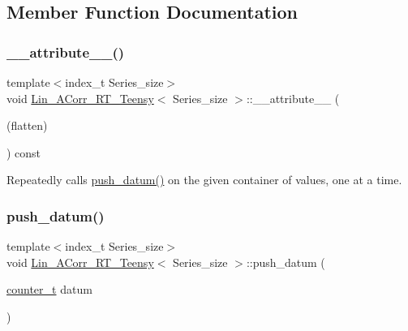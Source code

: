 \subsection{Member Function Documentation}
\mbox{\label{classLin__ACorr__RT__Teensy_a0bfee7278e28c759cca2497749aeecf7}} 
\subsubsection{\texorpdfstring{\+\_\+\+\_\+attribute\+\_\+\+\_\+()}{\_\_attribute\_\_()}}
{\footnotesize\ttfamily template$<$index\+\_\+t Series\+\_\+size$>$ \\
void \hyperlink{classLin__ACorr__RT__Teensy}{Lin\+\_\+\+A\+Corr\+\_\+\+R\+T\+\_\+\+Teensy}$<$ Series\+\_\+size $>$\+::\+\_\+\+\_\+attribute\+\_\+\+\_\+ (\begin{DoxyParamCaption}\item[{(flatten)}]{ }\end{DoxyParamCaption}) const}



Repeatedly calls {\ttfamily \hyperlink{classLin__ACorr__RT__Teensy_a0f5e5701923977b24a432ed0024c1368}{push\+\_\+datum()}} on the given container of values, one at a time. 

\mbox{\label{classLin__ACorr__RT__Teensy_a0f5e5701923977b24a432ed0024c1368}} 
\subsubsection{\texorpdfstring{push\+\_\+datum()}{push\_datum()}}
{\footnotesize\ttfamily template$<$index\+\_\+t Series\+\_\+size$>$ \\
void \hyperlink{classLin__ACorr__RT__Teensy}{Lin\+\_\+\+A\+Corr\+\_\+\+R\+T\+\_\+\+Teensy}$<$ Series\+\_\+size $>$\+::push\+\_\+datum (\begin{DoxyParamCaption}\item[{\hyperlink{types_8hpp_a22f279793847eba127de149437848c48}{counter\+\_\+t}}]{datum }\end{DoxyParamCaption})\hspace{0.3cm}{\ttfamily [inline]}}



